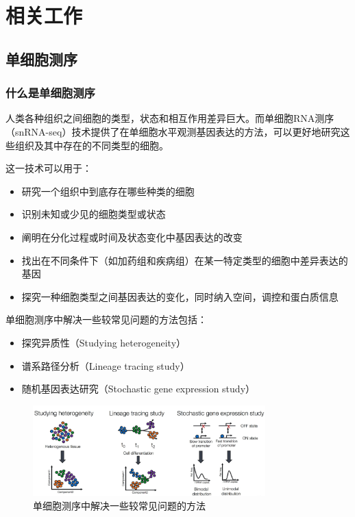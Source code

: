 
\chapter{相关工作}

\section{单细胞测序}

\subsection{什么是单细胞测序}
  人类各种组织之间细胞的类型，状态和相互作用差异巨大。而单细胞RNA测序（snRNA-seq）技术提供了在单细胞水平观测基因表达的方法，可以更好地研究这些组织及其中存在的不同类型的细胞。

  这一技术可以用于：
\begin{itemize}
    \item 研究一个组织中到底存在哪些种类的细胞
    \item 识别未知或少见的细胞类型或状态
    \item 阐明在分化过程或时间及状态变化中基因表达的改变
    \item 找出在不同条件下（如加药组和疾病组）在某一特定类型的细胞中差异表达的基因
    \item 探究一种细胞类型之间基因表达的变化，同时纳入空间，调控和蛋白质信息
\end{itemize}

  单细胞测序中解决一些较常见问题的方法\cite{liu2016single,junker2014every}包括：
\begin{itemize}
    \item 探究异质性（Studying heterogeneity）
    \item 谱系路径分析（Lineage tracing study）
    \item 随机基因表达研究（Stochastic gene expression study）
\end{itemize}

\begin{figure}[!htb]
  \centering
  \includegraphics[width=0.8\textwidth]{figs/scseq-purpose.png}
  \caption{单细胞测序中解决一些较常见问题的方法}
  \label{fig:scseq-purpose}
\end{figure}

